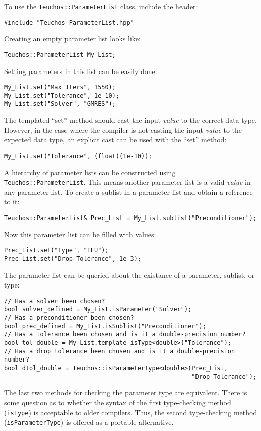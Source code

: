 To use the \verb!Teuchos::ParameterList! class, include the header:
{\small 
\begin{verbatim}
#include "Teuchos_ParameterList.hpp"
\end{verbatim}}
Creating an empty parameter list looks like:
{\small 
\begin{verbatim}
Teuchos::ParameterList My_List;
\end{verbatim}}
Setting parameters in this list can be easily done:
{\small
\begin{verbatim}
My_List.set("Max Iters", 1550);
My_List.set("Tolerance", 1e-10);
My_List.set("Solver", "GMRES");
\end{verbatim}}
The templated ``set'' method should cast the input {\it value} to the
correct data type.  However, in the case where the compiler is not casting the input
{\it value} to the expected data type, an explicit cast can be used with the ``set'' method:
{\small
\begin{verbatim}
My_List.set("Tolerance", (float)(1e-10));
\end{verbatim}}
A hierarchy of parameter lists can be constructed using {\tt Teuchos::ParameterList}.  This 
means another parameter list is a valid {\it value} in any parameter list.  To create a sublist
in a parameter list and obtain a reference to it:
{\small
\begin{verbatim}
Teuchos::ParameterList& Prec_List = My_List.sublist("Preconditioner");
\end{verbatim}}
Now this parameter list can be filled with values:
{\small
\begin{verbatim}
Prec_List.set("Type", "ILU");
Prec_List.set("Drop Tolerance", 1e-3);
\end{verbatim}}
The parameter list can be queried about the existance of a parameter, sublist, or type:
{\small
\begin{verbatim}
// Has a solver been chosen?
bool solver_defined = My_List.isParameter("Solver");
// Has a preconditioner been chosen?
bool prec_defined = My_List.isSublist("Preconditioner"); 
// Has a tolerance been chosen and is it a double-precision number?
bool tol_double = My_List.template isType<double>("Tolerance");
// Has a drop tolerance been chosen and is it a double-precision number?
bool dtol_double = Teuchos::isParameterType<double>(Prec_List,
                                                    "Drop Tolerance"); 
\end{verbatim}}
\noindent The last two methods for checking the parameter type are equivalent.
There is some question as to whether the syntax of the first type-checking
method ({\tt isType}) is acceptable to older compilers.  Thus, the second type-checking 
method ({\tt isParameterType}) is offered as a portable alternative.

